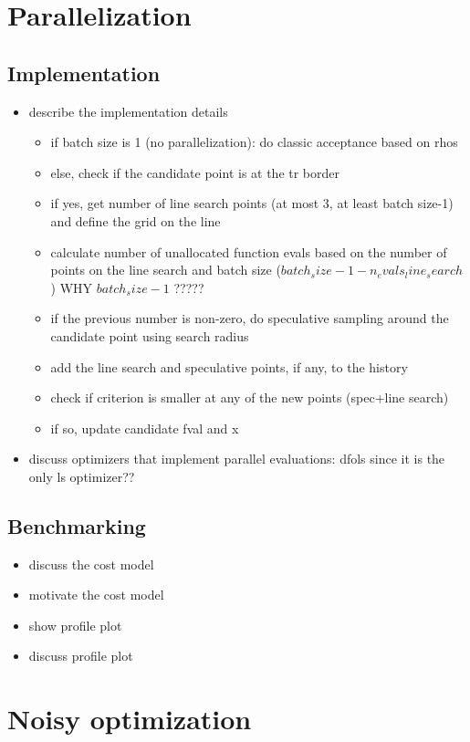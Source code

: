 \section{Parallelization}
\subsection{Implementation}
\begin{itemize}
\item describe the implementation details
\begin{itemize}
    \item if batch size is 1 (no parallelization): do classic acceptance based on rhos
    \item else, check if the candidate point is at the tr border
    \item if yes, get number of line search points (at most 3, at least batch size-1) and define the grid on the line
    \item calculate number of unallocated function evals based on the number of points on the line search and batch size ($batch_size-1-n_evals_line_search$) WHY $batch_size-1$ ?????
    \item if the previous number is non-zero, do speculative sampling around the candidate point using search radius
    \item add the line search and speculative points, if any, to the history
    \item check if criterion is smaller at any of the new points (spec+line search)
    \item if so, update candidate fval and x
\end{itemize}
\item discuss optimizers that implement parallel evaluations: dfols since it is the only ls optimizer??
\end{itemize}

\subsection{Benchmarking}
\begin{itemize}
    \item discuss the cost model
    \item motivate the cost model
    \item show profile plot
    \item discuss profile plot
\end{itemize}

\section{Noisy optimization}

